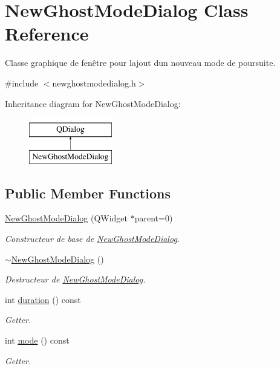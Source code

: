 \hypertarget{class_new_ghost_mode_dialog}{}\section{New\+Ghost\+Mode\+Dialog Class Reference}
\label{class_new_ghost_mode_dialog}


Classe graphique de fenêtre pour l\textquotesingle{}ajout d\textquotesingle{}un nouveau mode de poursuite.  




{\ttfamily \#include $<$newghostmodedialog.\+h$>$}

Inheritance diagram for New\+Ghost\+Mode\+Dialog\+:\begin{figure}[H]
\begin{center}
\leavevmode
\includegraphics[height=2.000000cm]{class_new_ghost_mode_dialog}
\end{center}
\end{figure}
\subsection*{Public Member Functions}
\begin{DoxyCompactItemize}
\item 
\hyperlink{class_new_ghost_mode_dialog_ac38be81a34c8e2a6c9582a29beeb1acd}{New\+Ghost\+Mode\+Dialog} (Q\+Widget $\ast$parent=0)
\begin{DoxyCompactList}\small\item\em Constructeur de base de \hyperlink{class_new_ghost_mode_dialog}{New\+Ghost\+Mode\+Dialog}. \end{DoxyCompactList}\item 
\hypertarget{class_new_ghost_mode_dialog_a4b7ed89ce68bb09cfaa5aebb1f484130}{}\hyperlink{class_new_ghost_mode_dialog_a4b7ed89ce68bb09cfaa5aebb1f484130}{$\sim$\+New\+Ghost\+Mode\+Dialog} ()\label{class_new_ghost_mode_dialog_a4b7ed89ce68bb09cfaa5aebb1f484130}

\begin{DoxyCompactList}\small\item\em Destructeur de \hyperlink{class_new_ghost_mode_dialog}{New\+Ghost\+Mode\+Dialog}. \end{DoxyCompactList}\item 
int \hyperlink{class_new_ghost_mode_dialog_aae6742233da69550c9ae1e1916ac4591}{duration} () const 
\begin{DoxyCompactList}\small\item\em Getter. \end{DoxyCompactList}\item 
int \hyperlink{class_new_ghost_mode_dialog_a73406f3e476866566fb17d8ca319ecda}{mode} () const 
\begin{DoxyCompactList}\small\item\em Getter. \end{DoxyCompactList}\end{DoxyCompactItemize}


